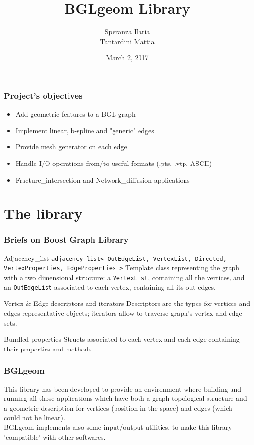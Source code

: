 \documentclass[11pt]{beamer}
\author{Speranza Ilaria \\ Tantardini Mattia}
\title{BGLgeom Library}
\institute{\textbf{Politecnico di Milano}}
\date{March 2, 2017}
\begin{document}
	\begin{frame}
		\maketitle
	\end{frame}
	
	\begin{frame}
		\frametitle{Project's objectives}
		\begin{itemize}
			\item Add geometric features to a BGL graph 
			\item Implement linear, b-spline and "generic" edges
			\item Provide mesh generator on each edge
			\item Handle I/O operations from/to useful formats (.pts, .vtp, ASCII) 
			\item Fracture\_intersection and Network\_diffusion applications 
		\end{itemize}
	\end{frame}
	
	\section{The library}
	\begin{frame}
		\frametitle{Briefs on Boost Graph Library}
		\begin{block}{Adjacency\_list}
			\texttt{adjacency\_list< OutEdgeList, VertexList, Directed, VertexProperties, EdgeProperties >} \newline
			Template class representing the graph with a two dimensional structure: 
			a \texttt{VertexList}, containing all the vertices, and an \texttt{OutEdgeList} associated to each vertex, containing all its out-edges.
		\end{block}
		
		\begin{block}{Vertex \& Edge descriptors and iterators}
			Descriptors are the types for vertices and edges representative objects; iterators allow to traverse graph's vertex and edge sets.
		\end{block}
		
		\begin{block}{Bundled properties}
			Structs associated to each vertex and each edge containing their properties and methods
		\end{block}	
	\end{frame}
	
	\begin{frame}
		\frametitle{BGLgeom}
		This library has been developed to provide an environment where building and running all those applications which have both a graph topological structure and a geometric description for vertices (position in the space) and edges (which could not be linear).\\
		BGLgeom implements also some input/output utilities, to make this library 'compatible' with other softwares.
	\end{frame}
	
\end{document}
